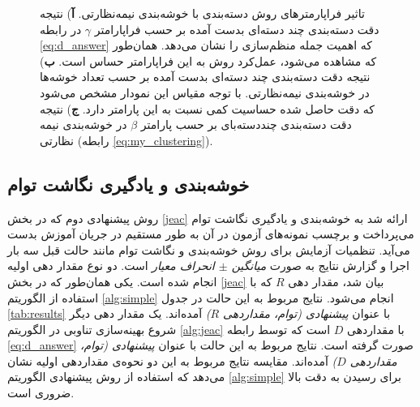\begin{figure}[!h]
\begin{subfigure}[b]{0.3\linewidth}
    \caption{}
  \end{subfigure}
  \caption[تحلیل فراپارامترهای روش دسته‌بندی با خوشه‌بندی نیمه‌نظارتی]{
  تاثیر فراپارمترهای  روش دسته‌بندی با خوشه‌بندی نیمه‌نظارتی.    \textbf{آ}) نتیجه دقت دسته‌بندی چند دسته‌ای بدست آمده بر حسب فراپارامتر  $\gamma$ در رابطه
 \eqref{eq:d_answer}
 که اهمیت جمله منظم‌سازی را نشان می‌دهد. همان‌طور که مشاهده می‌شود، عمل‌کرد روش به این فراپارامتر حساس است.
 \textbf{ب})
 نتیجه دقت  دسته‌بندی چند دسته‌ای بدست آمده بر حسب تعداد خوشه‌ها در خوشه‌بندی نیمه‌نظارتی. با توجه مقیاس این نمودار مشخص می‌شود که دقت حاصل شده حساسیت کمی نسبت به این پارامتر دارد.
  \textbf{ج})
  نتیجه دقت دسته‌بندی چنددسته‌بای بر حسب پارامتر $\beta$ در خوشه‌بندی نیمه نظارتی (رابطه \eqref{eq:my_clustering}).
 }
  \label{fig:simple_params}
  \end{figure}




\subsection{ خوشه‌بندی و یادگیری نگاشت توام}\label{exp:jeac}
روش پیشنهادی دوم که در بخش \ref{jeac} ارائه شد به خوشه‌بندی و یادگیری نگاشت توام می‌پرداخت و برچسب نمونه‌های آزمون در آن به طور مستقیم در جریان آموزش بدست می‌آید.
تنظمیات آزمایش برای روش خوشه‌بندی و نگاشت توام مانند حالت قبل سه بار اجرا و گزارش نتایج به صورت \textit{ میانگین $\pm$ انحراف معیار } است. دو نوع  مقدار دهی اولیه انجام شده است. یکی همان‌طور که در بخش \ref{jeac} بیان شد، مقدار دهی $R$ که با استفاده از الگوریتم
\ref{alg:simple}
انجام می‌شود. نتایج مربوط به این حالت در جدول  \ref{tab:results} با عنوان
\textit{ پیشنهادی (توام، مقداردهی $R$)}
آمده‌اند. یک مقدار دهی دیگر شروع بهینه‌سازی تناوبی در الگوریتم
\ref{alg:jeac}
 با مقداردهی $D$ است که توسط رابطه
\eqref{eq:d_answer}
صورت گرفته است. نتایج مربوط به این حالت با عنوان
\textit{پیشنهادی (توام، مقداردهی $D$)}
آمده‌اند. مقایسه نتایج مربوط به این دو نحوه‌ی مقداردهی اولیه نشان می‌دهد که استفاده از روش پیشنهادی الگوریتم \ref{alg:simple}  برای رسیدن به دقت بالا ضروری است.

